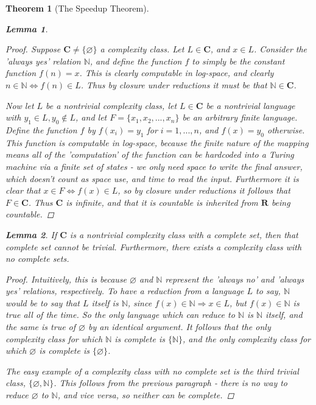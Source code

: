 \documentclass{article}
\theoremstyle{definition}
\theoremstyle{plain}
\theoremstyle{theorem}
\newtheorem{lemma}{Lemma}[section]
\newtheorem{theorem}{Theorem}[section]
\begin{document}
\begin{theorem}[The Speedup Theorem]
\begin{lemma}
\end{lemma} 
\begin{proof}
	Suppose $\textbf{C} \neq \{\varnothing\}$ a complexity class. Let $L \in \textbf{C}$, and $x \in L$. Consider the 'always yes' relation $\mathbb{N}$, and define the function $f$ to simply be the constant function $f(n) = x$. This is clearly computable in log-space, and clearly $n \in \mathbb{N} \iff f(n) \in L$. Thus by closure under reductions it must be that $\mathbb{N} \in \textbf{C}$. 
	\par Now let $L$ be a nontrivial complexity class, let $L \in \textbf{C}$ be a nontrivial language with $y_1 \in L, y_0 \notin L$, and let $F = \{x_1,x_2,...,x_n\}$ be an arbitrary finite language. Define the function $f$ by $f(x_i) = y_1$ for $i=1,...,n$, and $f(x) = y_0$ otherwise. This function is computable in log-space, because the finite nature of the mapping means all of the 'computation' of the function can be hardcoded into a Turing machine via a finite set of states - we only need space to write the final answer, which doesn't count as space use, and time to read the input. Furthermore it is clear that $x \in F \iff f(x) \in L$, so by closure under reductions it follows that $F \in \textbf{C}$. Thus $\textbf{C}$ is infinite, and that it is countable is inherited from $\textbf{R}$ being countable.
\end{proof}
\begin{lemma}
	If $\textbf{C}$ is a nontrivial complexity class with a complete set, then that complete set cannot be trivial. Furthermore, there exists a complexity class with no complete sets.
\end{lemma}
\begin{proof}
	Intuitively, this is because $\varnothing$ and $\mathbb{N}$ represent the 'always no' and 'always yes' relations, respectively. To have a reduction from a language $L$ to say, $\mathbb{N}$ would be to say that $L$ itself is $\mathbb{N}$, since $f(x) \in \mathbb{N} \Rightarrow x \in L$, but $f(x) \in \mathbb{N}$ is true all of the time. So the only language which can reduce to $\mathbb{N}$ is $\mathbb{N}$ itself, and the same is true of $\varnothing$ by an identical argument. It follows that the only complexity class for which $\mathbb{N}$ is complete is $\{\mathbb{N}\}$, and the only complexity class for which $\varnothing$ is complete is $\{\varnothing\}$.
	\par The easy example of a complexity class with no complete set is the third trivial class, $\{\varnothing,\mathbb{N}\}$. This follows from the previous paragraph - there is no way to reduce $\varnothing$ to $\mathbb{N}$, and vice versa, so neither can be complete. 

\end{proof}
\end{theorem}
\end{document}
